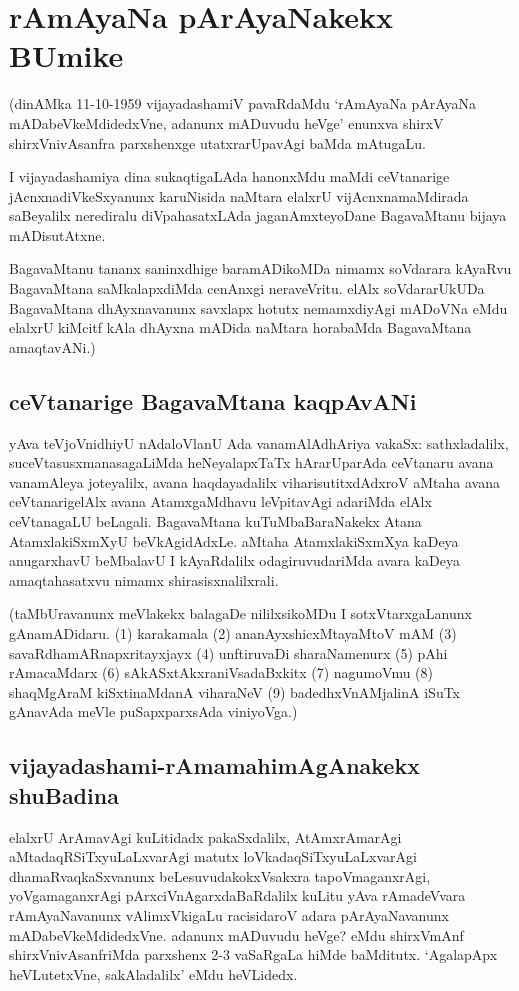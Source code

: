 \chapter{rAmAyaNa pArAyaNakekx BUmike} 

(dinAMka 11-10-1959 vijayadashamiV pavaRdaMdu `rAmAyaNa pArAyaNa mADabeVkeMdidedxVne, adanunx mADuvudu heVge' enunxva shirxV shirxVnivAsanfra parxshenxge utatxrarUpavAgi baMda mAtugaLu. 

I vijayadashamiya dina sukaqtigaLAda hanonxMdu maMdi ceVtanarige jAcnxnadiVkeSxyanunx karuNisida naMtara elalxrU vijAcnxnamaMdirada saBeyalilx nerediralu diVpahasatxLAda jaganAmxteyoDane BagavaMtanu bijaya mADisutAtxne. 

BagavaMtanu tananx saninxdhige baramADikoMDa nimamx soVdarara kAyaRvu BagavaMtana saMkalapxdiMda cenAnxgi neraveVritu. elAlx soVdararUkUDa BagavaMtana dhAyxnavanunx savxlapx hotutx nemamxdiyAgi mADoVNa eMdu elalxrU kiMcitf kAla dhAyxna mADida naMtara horabaMda BagavaMtana amaqtavANi.) 

\section*{ceVtanarige BagavaMtana kaqpAvANi} 

yAva teVjoVnidhiyU nAdaloVlanU Ada vanamAlAdhAriya vakaSx: sathxladalilx, suceVtasusxmanasagaLiMda heNeyalapxTaTx hArarUparAda ceVtanaru avana vanamAleya joteyalilx, avana haqdayadalilx viharisutitxdAdxroV aMtaha avana ceVtanarigelAlx avana AtamxgaMdhavu leVpitavAgi adariMda elAlx ceVtanagaLU beLagali. BagavaMtana kuTuMbaBaraNakekx Atana AtamxlakiSxmXyU beVkAgidAdxLe. aMtaha AtamxlakiSxmXya kaDeya anugarxhavU beMbalavU I kAyaRdalilx odagiruvudariMda avara kaDeya amaqtahasatxvu nimamx shirasisxnalilxrali. 

(taMbUravanunx meVlakekx balagaDe nililxsikoMDu I sotxVtarxgaLanunx gAnamADidaru. (1) karakamala (2) ananAyxshicxMtayaMtoV mAM (3) savaRdhamARnapxritayxjayx (4) unftiruvaDi sharaNamenurx (5) pAhi rAmacaMdarx (6) sAkASxtAkxraniVsadaBxkitx (7) nagumoVmu (8) shaqMgAraM kiSxtinaMdanA viharaNeV (9) badedhxVnAMjalinA iSuTx gAnavAda meVle puSapxparxsAda viniyoVga.) 

\section*{vijayadashami-rAmamahimAgAnakekx shuBadina} 

elalxrU ArAmavAgi kuLitidadx pakaSxdalilx, AtAmxrAmarAgi aMtadaqRSiTxyuLaLxvarAgi matutx loVkadaqSiTxyuLaLxvarAgi dhamaRvaqkaSxvanunx beLesuvudakokxVsakxra tapoVmaganxrAgi, yoVgamaganxrAgi pArxciVnAgarxdaBaRdalilx kuLitu yAva rAmadeVvara rAmAyaNavanunx vAlimxVkigaLu racisidaroV adara pArAyaNavanunx mADabeVkeMdidedxVne. adanunx mADuvudu heVge? eMdu shirxVmAnf shirxVnivAsanfriMda parxshenx 2-3 vaSaRgaLa hiMde baMditutx. `AgalapApx heVLutetxVne, sakAladalilx' eMdu heVLidedx. 

